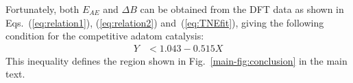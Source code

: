 \documentclass[aps,prl,reprint,amsmath,amssymb,floatfix,notitlepage]{revtex4-1}
\begin{document}
Fortunately, both $E_{AE}$ and $\Delta B$ can be obtained from the DFT data as shown in Eqs.~(\ref{eq:relation1}), (\ref{eq:relation2}) and~(\ref{eq:TNEfit}), giving the following condition for the competitive adatom catalysis:
%
\begin{equation}
\begin{split}
Y &< 1.043 - 0.515 X
\end{split}
\end{equation}
%
This inequality defines the region shown in Fig.~\ref{main-fig:conclusion} in the main text.



\end{document}
